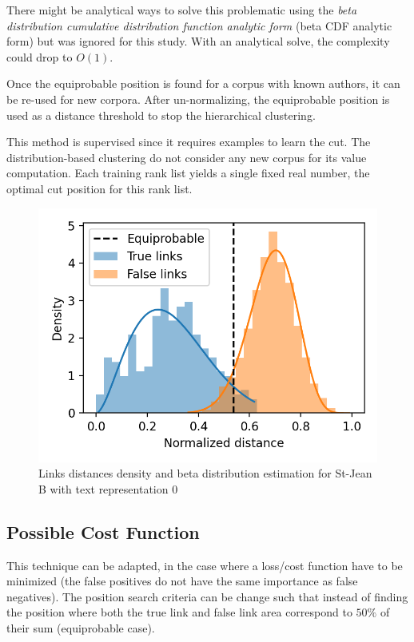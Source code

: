 There might be analytical ways to solve this problematic using the \textit{beta distribution cumulative distribution function analytic form} (beta CDF analytic form) but was ignored for this study.
With an analytical solve, the complexity could drop to $O(1)$.

Once the equiprobable position is found for a corpus with known authors, it can be re-used for new corpora.
After un-normalizing, the equiprobable position is used as a distance threshold to stop the hierarchical clustering.

This method is supervised since it requires examples to learn the cut.
The distribution-based clustering do not consider any new corpus for its value computation.
Each training rank list yields a single fixed real number, the optimal cut position for this rank list.

\begin{figure}
  \caption{Links distances density and beta distribution estimation for St-Jean B with text representation 0}
  \label{fig:links_score_density}
  \includegraphics[width=\linewidth]{img/links_score_density.png}
\end{figure}

\subsection{Possible Cost Function}

This technique can be adapted, in the case where a loss/cost function have to be minimized (the false positives do not have the same importance as false negatives).
The position search criteria can be change such that instead of finding the position where both the true link and false link area correspond to $50\%$ of their sum (equiprobable case).


